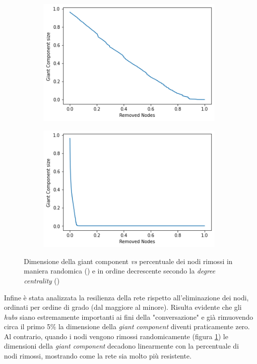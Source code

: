     \begin{figure}
        \begin{subfigure}{.5\textwidth}
            \centering
            \caption{}
            \includegraphics[scale=.4]{6_Network_resilience/random_node_dismantle.png}
            \label{fig:Random_network_resilience}
        \end{subfigure}
        \centering
        \begin{subfigure}{.5\textwidth}
            \centering
            \caption{}
            \includegraphics[scale=.4]{6_Network_resilience/hubs_node_dismantle.png}
            \label{fig:Hubs_network_resilience}
        \end{subfigure}
        \caption{Dimensione della giant component \textit{vs} percentuale dei nodi rimossi in maniera randomica () e in ordine decrescente secondo la \textit{degree centrality} ()}
        \label{fig:weights_1}
    \end{figure}
    
    Infine è stata analizzata la resilienza della rete rispetto all’eliminazione dei nodi, ordinati per ordine di grado (dal maggiore al minore). Risulta evidente che gli \textit{hubs} siano estremamente importanti ai fini della "conversazione" e già rimuovendo circa il primo 5\% la dimensione della \textit{giant component} diventi praticamente zero. Al contrario, quando i nodi vengono rimossi randomicamente (figura \ref{fig:Random_network_resilience}) le dimensioni della \textit{giant component} decadono linearmente con la percentuale di nodi rimossi, mostrando come la rete sia molto più resistente.
    
    




    